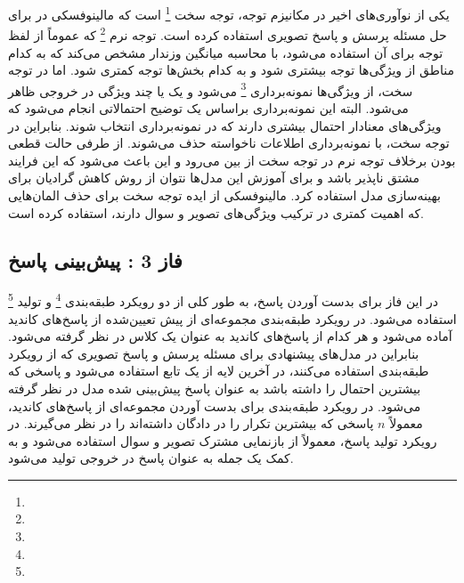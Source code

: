 یکی از نوآوری‌های اخیر در مکانیزم توجه، توجه سخت
\footnote{}
است که مالینوفسکی در 
\cite{malinowski2018learning}
 برای حل مسئله پرسش و پاسخ تصویری استفاده کرده است. توجه نرم
\footnote{}
که عموماً از لفظ توجه برای آن استفاده می‌شود، با محاسبه میانگین وزندار مشخص می‌کند که به کدام مناطق از ویژگی‌ها توجه بیشتری شود و به کدام بخش‌ها توجه کمتری شود. اما در توجه سخت، از ویژگی‌ها نمونه‌برداری
\footnote{}
 ‌می‌شود و یک یا چند ویژگی در خروجی ظاهر می‌شود. البته این نمونه‌برداری براساس یک توضیح احتمالاتی انجام می‌شود که ویژگی‌های معنادار احتمال بیشتری دارند که در نمونه‌برداری انتخاب شوند. بنابراین در توجه سخت، با نمونه‌برداری اطلاعات ناخواسته حذف می‌شوند. از طرفی حالت قطعی بودن برخلاف توجه نرم در توجه سخت از بین می‌رود و این باعث می‌شود که این فرایند مشتق ناپذیر باشد و برای آموزش این مدل‌ها نتوان از روش کاهش گرادیان برای بهینه‌سازی مدل استفاده کرد. مالینوفسکی
\cite{malinowski2018learning}
  از ایده توجه سخت برای حذف المان‌هایی که اهمیت کمتری در ترکیب ویژگی‌های تصویر و سوال دارند، استفاده کرده است.

\subsection{فاز 3 : پیش‌بینی پاسخ}
در این فاز برای بدست آوردن پاسخ، به طور کلی از دو رویکرد طبقه‌بندی
\footnote{}
 و تولید
\footnote{}
استفاده می‌شود. در رویکرد طبقه‌بندی مجموعه‌ای از پیش تعیین‌شده از پاسخ‌های کاندید آماده می‌شود و هر کدام از پاسخ‌های کاندید به عنوان یک کلاس در نظر گرفته می‌شود. بنابراین در مدل‌های پیشنهادی برای مسئله پرسش و پاسخ تصویری که از رویکرد طبقه‌بندی استفاده می‌کنند، در آخرین لایه از یک تابع
استفاده می‌شود و پاسخی که بیشترین احتمال را داشته باشد به عنوان پاسخ پیش‌بینی شده مدل در نظر گرفته می‌شود. در رویکرد طبقه‌بندی برای بدست آوردن مجموعه‌ای از پاسخ‌های کاندید، معمولاً $n$ پاسخی که بیشترین تکرار را در ‌دادگان داشته‌اند را در نظر می‌گیرند. در رویکرد تولید پاسخ، معمولاً از بازنمایی مشترک تصویر و سوال استفاده می‌شود و به کمک 
یک جمله به عنوان پاسخ در خروجی تولید می‌شود.

